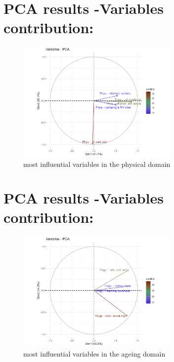 \documentclass[
  letterpaper,
  DIV=11,
  numbers=noendperiod]{scrartcl}
\begin{document}
\hypertarget{pca-results--variables-contribution}{%
\section{PCA results -Variables
contribution:}\label{pca-results--variables-contribution}}

\begin{figure}

{\centering \includegraphics[width=0.7\textwidth,height=\textheight]{imgs/pca_var_physical.png}

}

\caption{most influential variables in the physical domain}

\end{figure}

\hypertarget{pca-results--variables-contribution-1}{%
\section{PCA results -Variables
contribution:}\label{pca-results--variables-contribution-1}}

\begin{figure}

{\centering \includegraphics[width=0.7\textwidth,height=\textheight]{imgs/pca_var_cognitive.png}

}

\caption{most influential variables in the ageing domain}

\end{figure}
\end{document}
